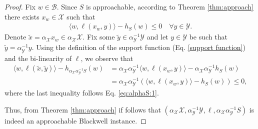 \documentclass[a4paper,12pt]{article}
\newcommand{\mY}{\mathcal{Y}}
\newcommand{\mX}{\mathcal{X}}
\newcommand{\mB}{\mathcal{B}}
\begin{document}
\begin{proof}\label{proof: alphaS app}
Fix $w\in\mB$. Since $S$ is approachable, according to Theorem \ref{thm:approach} there exists $x_w \in \mathcal{X}$ such that
\begin{align}\label{eq:alphaS:1}
\langle w, \ell (x_w, y) \rangle - h_S(w) \leq 0 \quad \forall y \in \mathcal{Y}.
\end{align}
Denote $\tilde{x} = \alpha_{\mX} x_w \in \alpha_{\mX}  \mX$. Fix some $\tilde{y}\in\alpha_{\mY}^{-1}\mY$ and let $y\in\mY$ be such that $\tilde{y} = \alpha_{\mY}^{-1}y$.
Using the definition of the support function (Eq. \eqref{support function}) and the bi-linearity of $\ell$, we observe that
 \begin{align*}
\langle w, \ell (\tilde{x}, \tilde{y}) \rangle - h_{\alpha_{\mX}\alpha_{\mY}^{-1} S}(w) &= \alpha_{\mX} \alpha_{\mY}^{-1} \langle w, \ell (x_w, y) \rangle - \alpha_{\mX} \alpha_{\mY}^{-1}  h_S(w) \\
&= \alpha_{\mX} \alpha_{\mY}^{-1} \left(\langle w, \ell (x_w, y) \rangle - h_S(w) \right)\leq 0,
\end{align*}
where the last inequality follows Eq. \eqref{eq:alphaS:1}.



Thus, from Theorem \ref{thm:approach} if follows that $(\alpha_{\mX}\mX,\alpha_{\mY}^{-1}\mY ,\ell ,\alpha_{\mX}\alpha_{\mY}^{-1}S)$ is indeed an approachable Blackwell instance.


\end{proof}
\end{document}
